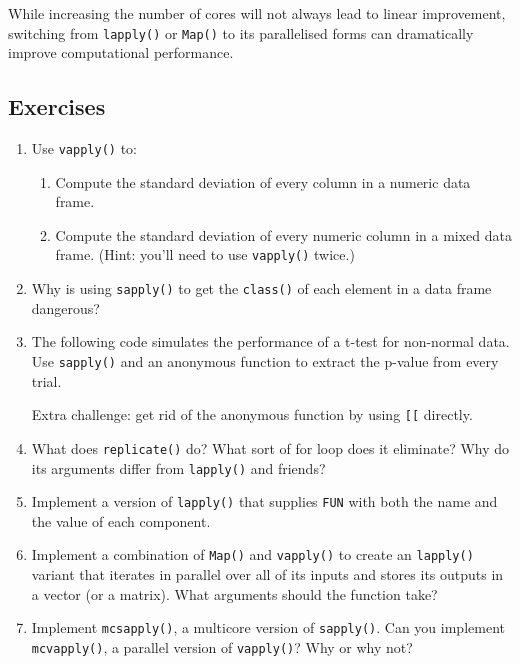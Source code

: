 While increasing the number of cores will not always lead to linear
improvement, switching from \texttt{lapply()} or \texttt{Map()} to its
parallelised forms can dramatically improve computational performance.

\subsection{Exercises}

\begin{enumerate}
\def\labelenumi{\arabic{enumi}.}
\item
  Use \texttt{vapply()} to:

  \begin{enumerate}
  \def\labelenumii{\alph{enumii})}
  \item
    Compute the standard deviation of every column in a numeric data
    frame.
  \item
    Compute the standard deviation of every numeric column in a mixed
    data frame. (Hint: you'll need to use \texttt{vapply()} twice.)
  \end{enumerate}
\item
  Why is using \texttt{sapply()} to get the \texttt{class()} of each
  element in a data frame dangerous?
\item
  The following code simulates the performance of a t-test for
  non-normal data. Use \texttt{sapply()} and an anonymous function to
  extract the p-value from every trial.

\begin{Shaded}
\begin{Highlighting}[]
\StringTok{ }\NormalTok{(}
  \NormalTok{, }
  \NormalTok{(}\NormalTok{(}\NormalTok{, }\NormalTok{), }\NormalTok{(}\NormalTok{, }\NormalTok{)),}
   
\NormalTok{)}
\end{Highlighting}
\end{Shaded}

  Extra challenge: get rid of the anonymous function by using
  \texttt{{[}{[}} directly.
\item
  What does \texttt{replicate()} do? What sort of for loop does it
  eliminate? Why do its arguments differ from \texttt{lapply()} and
  friends?
\item
  Implement a version of \texttt{lapply()} that supplies \texttt{FUN}
  with both the name and the value of each component.
\item
  Implement a combination of \texttt{Map()} and \texttt{vapply()} to
  create an \texttt{lapply()} variant that iterates in parallel over all
  of its inputs and stores its outputs in a vector (or a matrix). What
  arguments should the function take?
\item
  Implement \texttt{mcsapply()}, a multicore version of
  \texttt{sapply()}. Can you implement \texttt{mcvapply()}, a parallel
  version of \texttt{vapply()}? Why or why not?
\end{enumerate}

